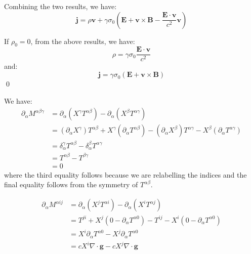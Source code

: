 \documentclass[12pt]{article}
\begin{document}
Combining the two results, we have:
\begin{equation}
    \mathbf{j} = \rho \mathbf{v} + \gamma \sigma_{0} \left( \mathbf{E} + \mathbf{v} \times \mathbf{B} - \frac{\mathbf{E} \cdot \mathbf{v}}{c^{2}} \mathbf{v} \right)
\end{equation}

If $\rho_{0} = 0$, from the above results, we have:
\begin{equation}
    \rho = \gamma \sigma_{0} \frac{\mathbf{E} \cdot \mathbf{v}}{c^{2}}
\end{equation}
and:
\begin{equation}
    \mathbf{j} = \gamma \sigma_{0} \left( \mathbf{E} + \mathbf{v} \times \mathbf{B} \right)
\end{equation}
\qed



We have:
\begin{equation}
    \begin{split}
        \partial_{\alpha} M^{\alpha \beta \gamma} &= \partial_{\alpha} (X^{\gamma} T^{\alpha \beta}) - \partial_{\alpha} (X^{\beta} T^{\alpha \gamma}) \\
        &= (\partial_{\alpha} X^{\gamma}) T^{\alpha \beta} + X^{\gamma} (\partial_{\alpha} T^{\alpha \beta}) - (\partial_{\alpha} X^{\beta}) T^{\alpha \gamma} - X^{\beta} (\partial_{\alpha} T^{\alpha \gamma}) \\
        &= \delta^{\gamma}_{\alpha} T^{\alpha \beta} - \delta^{\beta}_{\alpha} T^{\alpha \gamma} \\
        &= T^{\alpha \beta} - T^{\beta \gamma} \\
        &= 0
    \end{split}
\end{equation}
where the third equality follows because we are relabelling the indices and the final equality follows from the symmetry of $T^{\alpha \beta}$.

\begin{equation}
    \begin{split}
        \partial_{\alpha} M^{\alpha i j} &= \partial_{\alpha} (X^{j} T^{\alpha i}) - \partial_{\alpha} (X^{i} T^{\alpha j}) \\
        &= T^{ji} + X^{j} (0 - \partial_{\alpha} T^{\alpha 0}) - T^{ij} - X^{i} (0 - \partial_{\alpha} T^{\alpha 0}) \\
        &= X^{i} \partial_{\alpha} T^{\alpha 0} - X^{j} \partial_{\alpha} T^{\alpha 0} \\
        &= cX^{i} \nabla \cdot \mathbf{g} - cX^{j} \nabla \cdot \mathbf{g} \\
    \end{split}
\end{equation}
\end{document}
